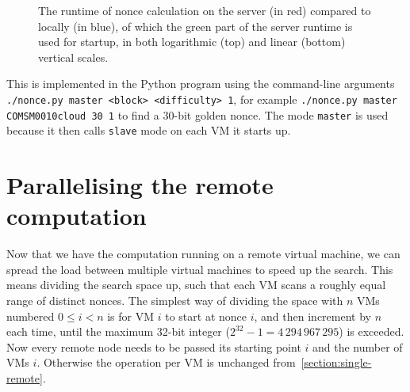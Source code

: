 \documentclass[letterpaper,twocolumn,11pt]{article}
\begin{document}
\begin{figure}[p]
\noindent{}
\noindent{}
\caption{The runtime of nonce calculation on the server (in red) compared to locally (in blue), of which the green part of the server runtime is used for startup, in both logarithmic (top) and linear (bottom) vertical scales.}\label{fig:single-graph}
\end{figure}

This is implemented in the Python program using the command-line arguments \texttt{./nonce.py master <block> <difficulty> 1}, for example \verb|./nonce.py master COMSM0010cloud 30 1| to find a 30-bit golden nonce. The mode \texttt{master} is used because it then calls \texttt{slave} mode on each VM it starts up.

\section{Parallelising the remote computation}

Now that we have the computation running on a remote virtual machine, we can spread the load between multiple virtual machines to speed up the search. This means dividing the search space up, such that each VM scans a roughly equal range of distinct nonces.
The simplest way of dividing the space with $n$ VMs numbered $0\leq i<n$ is for VM $i$ to start at nonce $i$, and then increment by $n$ each time, until the maximum 32-bit integer ($2^{32}-1=4\,294\,967\,295$) is exceeded. Now every remote node needs to be passed its starting point $i$ and the number of VMs $i$. Otherwise the operation per VM is unchanged from~\autoref{section:single-remote}.
\end{document}
